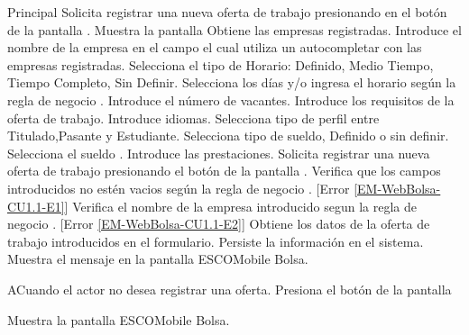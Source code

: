 	\begin{UCtrayectoria}{Principal}
	\UCpaso[\UCactor] Solicita registrar una nueva oferta de trabajo presionando en el botón  de la pantalla .
	\UCpaso Muestra la pantalla 
	\UCpaso Obtiene las empresas registradas.
	\UCpaso [\UCactor] Introduce el nombre de la empresa en el campo el cual utiliza un autocompletar con las empresas registradas.
	\UCpaso [\UCactor] Selecciona el tipo de Horario: Definido, Medio Tiempo, Tiempo Completo, Sin Definir.
	\UCpaso [\UCactor] Selecciona los días y/o ingresa el horario según la regla de negocio  .
	\UCpaso [\UCactor] Introduce el número de vacantes.
	\UCpaso [\UCactor] Introduce los requisitos de la oferta de trabajo.
	\UCpaso [\UCactor] Introduce  idiomas.
	\UCpaso [\UCactor] Selecciona tipo de perfil entre Titulado,Pasante y Estudiante.
	\UCpaso [\UCactor] Selecciona tipo de sueldo, Definido o sin definir.
	\UCpaso [\UCactor] Selecciona el sueldo .
	\UCpaso [\UCactor] Introduce las prestaciones.
	\UCpaso [\UCactor] Solicita registrar una nueva oferta de trabajo presionando el botón  de la pantalla .  
	\UCpaso Verifica que los campos introducidos no estén vacios según la regla de negocio . [Error \ref{EM-WebBolsa-CU1.1-E1}] 
	\UCpaso Verifica el nombre de la empresa introducido segun la regla de negocio  . [Error \ref{EM-WebBolsa-CU1.1-E2}] 
	\UCpaso Obtiene los datos de la oferta de trabajo introducidos en el formulario. 
	\UCpaso Persiste la información en el sistema.
	\UCpaso Muestra el mensaje  en la pantalla ESCOMobile Bolsa.  
	
	
	\end{UCtrayectoria}

\begin{UCtrayectoriaA}{A}{Cuando el actor no desea registrar una oferta.}
	\UCpaso [\UCactor] Presiona el botón  de la pantalla 

	\UCpaso Muestra la pantalla ESCOMobile Bolsa.  
\end{UCtrayectoriaA}
